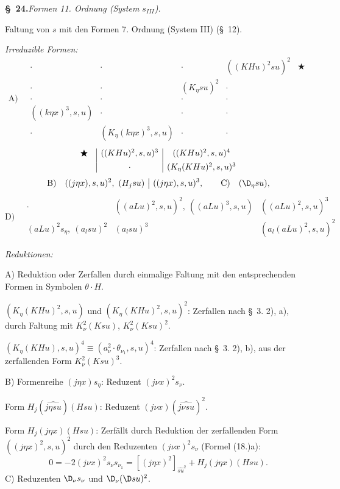 \begin{center}\textbf{\S\ 24.}\quad\emph{Formen 11. Ordnung (System $s_{III}$).}\end{center}
Faltung von $s$ mit den Formen 7. Ordnung (System III) (\S\ 12).

\noindent\emph{Irreduzible Formen:}
\[
\text{A)}\quad
\begin{array}{c|c|c|c|c}
\cdot&\cdot&\cdot&((KHu)^2su)^2&\bigstar\\[0.35em]
\cdot&\cdot&(K_\eta su)^2&\cdot&\\[0.35em]
\cdot&\cdot&\cdot&\cdot&\\[0.35em]
((k\eta x)^3,s,u)&\cdot&\cdot&\cdot&\\[0.35em]
\cdot&(K_\eta(k\eta x)^3,s,u)&\cdot&\cdot&
\end{array}
\]
\[
\begin{array}{c@{\quad}|c|c}
\bigstar&((KHu)^2,s,u)^3&((KHu)^2,s,u)^4\\[0.45em]
&\cdot&(K_\eta(KHu)^2,s,u)^3
\end{array}
\]
\[
\text{B)}\quad ((j\eta x),s,u)^2,\ (H_jsu)\ \big|\ ((j\eta x),s,u)^3,
\qquad \text{C)}\quad (\D_\eta su),
\]
\[
\text{D)}\quad
\begin{array}{c|c|c}
\cdot&((aLu)^2,s,u)^2,\ ((aLu)^3,s,u)&((aLu)^2,s,u)^3\\[0.5em]
(aLu)^2s_\eta,\ (a_lsu)^2&(a_lsu)^3&(a_l(aLu)^2,s,u)^2
\end{array}
\]

\noindent\emph{Reduktionen:}

A) Reduktion oder Zerfallen durch einmalige Faltung mit den entsprechenden Formen in Symbolen $\theta\cdot H$.

$(K_\eta(KHu)^2,s,u)$ und $(K_\eta(KHu)^2,s,u)^2$: Zerfallen nach \S\ 3. 2), a), durch Faltung mit $K_\nu^2(Ksu)$, $K_\nu^2(Ksu)^2$.

$(K_\eta(KHu),s,u)^4\equiv(a_\nu^2\cdot\theta_{\nu_1},s,u)^4$: Zerfallen nach \S\ 3. 2), b), aus der zerfallenden Form $K_\nu^2(Ksu)^3$.

B) Formenreihe $(j\eta x)s_\eta$: Reduzent $(j\nu x)^2s_\nu$.

Form $H_j(\widehat{j\eta su})(Hsu)$: Reduzent $(j\nu x)(\widehat{j\nu su})^2$.

Form $H_j(j\eta x)(Hsu)$: Zerfällt durch Reduktion der zerfallenden Form $((j\eta x)^2,s,u)^2$ durch den Reduzenten $(j\nu x)^2s_\nu$ (Formel (18.)a):
\[
0=-2(j\nu x)^2s_\nu s_{\nu_1}=[(j\eta x)^2]_{\widehat{su}^2}+H_j(j\eta x)(Hsu).
\]
C) Reduzenten $\D_\nu s_\nu$ und $\D_\nu(\D su)^2$.

